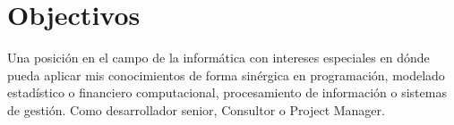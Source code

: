\section{Objectivos}

Una posición en el campo de la informática con intereses especiales en dónde pueda aplicar mis
conocimientos de forma sinérgica en programación, modelado estadístico o financiero computacional,
procesamiento de información o sistemas de gestión. Como desarrollador senior, Consultor o Project Manager.

